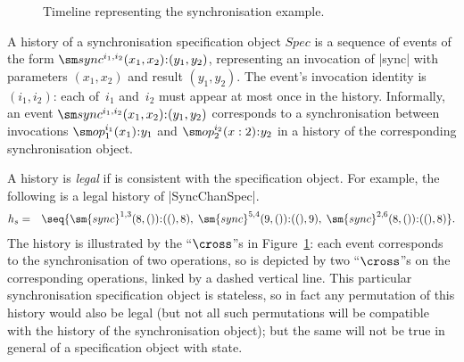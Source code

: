 
\begin{figure}
\unScalaMid
\begin{center}
\end{center}
\caption{Timeline representing the synchronisation example.}
\label{fig:sync-timeline}
\scalaMid
\end{figure}


A history of a synchronisation specification object $Spec$ is a sequence of
events of the form $\sync^{i_1, i_2}(x_1, x_2)\:: (y_1, y_2)$, representing an
invocation of |sync| with parameters $(x_1, x_2)$ and result $(y_1,y_2)$.  The
event's invocation identity is~$(i_1,i_2)$: each of~$i_1$ and~$i_2$ must
appear at most once in the history.  Informally, an event $\sync^{i_1,
  i_2}(x_1, x_2)\:: (y_1, y_2)$ corresponds to a synchronisation between
invocations $\op_1^{i_1}(x_1)\::y_1$ and $\op_2^{i_2}(x:2)\::y_2$ in a history
of the corresponding synchronisation object.

A history is \emph{legal} if is consistent with the specification object.  
%
For example, the following is a legal history of |SyncChanSpec|.
\begin{eqnarray*}
h_s & = & 
\seq{
 \sm{sync}^{1,3}(8,()) \:: ((), 8), \;
 \sm{sync}^{5,4}(9,()) \:: ((), 9), \;
 \sm{sync}^{2,6}(8,()) \:: ((), 8) } .
\end{eqnarray*}
The history is illustrated by the ``$\cross$''s in
Figure~\ref{fig:sync-timeline}: each event corresponds to the synchronisation
of two operations, so is depicted by two ``$\cross$''s on the corresponding
operations, linked by a dashed vertical line.  This particular synchronisation
specification object is stateless, so in fact any permutation of this history
would also be legal (but not all such permutations will be compatible with the
history of the synchronisation object); but the same will not be true in
general of a specification object with state.

